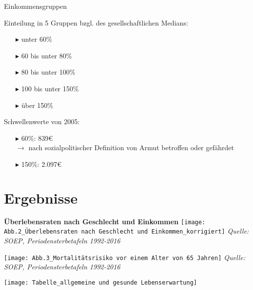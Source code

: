 \documentclass{beamer}
\begin{document}
\begin{frame}{Einkommensgruppen}
	\begin{block}{Einteilung in 5 Gruppen bzgl. des gesellschaftlichen Medians:}
		\begin{itemize}
			\item[$\blacktriangleright$] unter 60\%
			\item[$\blacktriangleright$] 60 bis unter 80\%
			\item[$\blacktriangleright$] 80 bis unter 100\%
			\item[$\blacktriangleright$] 100 bis unter 150\%
			\item[$\blacktriangleright$] über 150\%
		\end{itemize}
	\end{block}
	\begin{block}{Schwellenwerte von 2005:}
		\begin{itemize}
			\item[$\blacktriangleright$] 60\%: 839€ \\ $\rightarrow$ nach sozialpolitischer Definition von Armut betroffen oder gefährdet
			\item[$\blacktriangleright$] 150\%: 2.097€
		\end{itemize}
	\end{block}
\end{frame}



\section{Ergebnisse}
\begin{frame}
\textbf{Überlebensraten nach Geschlecht und Einkommen}
	\texttt{[image: Abb.2\_Überlebensraten nach Geschlecht und Einkommen\_korrigiert]}
\emph{Quelle: SOEP, Periodensterbetafeln 1992-2016}
\end{frame}

\begin{frame}
	\texttt{[image: Abb.3\_Mortalitätsrisiko vor einem Alter von 65 Jahren]}
\emph{Quelle: SOEP, Periodensterbetafeln 1992-2016}	
\end{frame}

\begin{frame}
	\texttt{[image: Tabelle\_allgemeine und gesunde Lebenserwartung]}
\end{frame}


 
 
\end{document}

